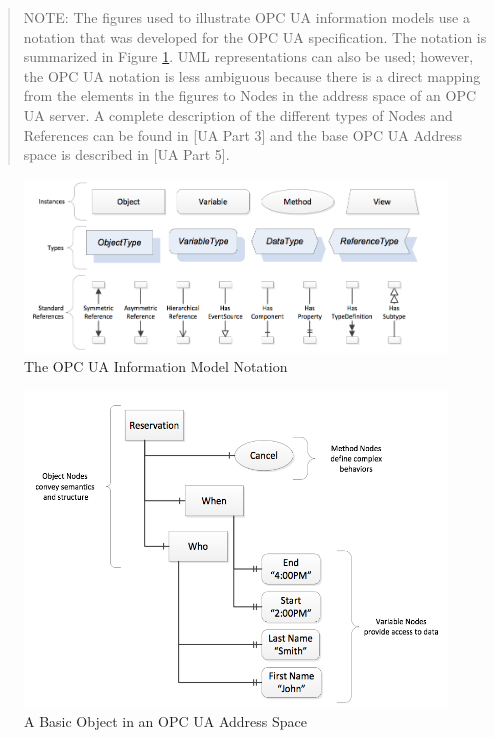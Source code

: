 \documentclass{mtconnect}	%
\begin{document}
\begin{quote}
\footnotesize
NOTE: The figures used to illustrate OPC UA information models use a notation that was developed for the OPC UA specification. The notation is summarized in Figure \ref{fig:opc_ua_notation}. UML representations can also be used; however, the OPC UA notation is less ambiguous because there is a direct mapping from the elements in the figures to Nodes in the address space of an OPC UA server. A complete description of the different types of Nodes and References can be found in [UA Part 3] and the base OPC UA Address space is described in [UA Part 5].
\end{quote}

\begin{figure}[h]
  \centering
  \includegraphics[width=1.0\textwidth]{diagrams/OpcInfoModelNotation.png}
  \caption{The OPC UA Information Model Notation}
  \label{fig:opc_ua_notation}
\end{figure}

\begin{figure}[h]
  \centering
  \includegraphics[width=1.0\textwidth]{diagrams/OpcUaBasicObject.png}
  \caption{A Basic Object in an OPC UA Address Space}
  \label{fig:opcua_basic_object}
\end{figure}
\end{document}
